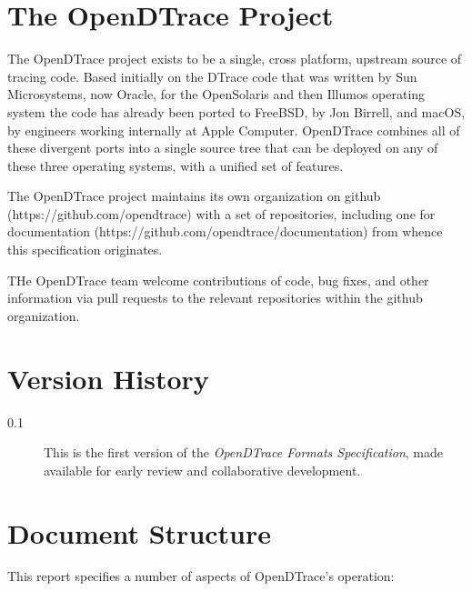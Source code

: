 
\section{The OpenDTrace Project}
\label{sec:opendtrace-project}

The OpenDTrace project exists to be a single, cross platform, upstream
source of tracing code.  Based initially on the DTrace code that was
written by Sun Microsystems, now Oracle, for the OpenSolaris and then
Illumos operating system the code has already been ported to FreeBSD,
by Jon Birrell, and macOS, by engineers working internally at Apple
Computer.  OpenDTrace combines all of these divergent ports into a
single source tree that can be deployed on any of these three
operating systems, with a unified set of features.  

The OpenDTrace project maintains its own organization on github
(https://github.com/opendtrace) with a set of repositories, including
one for documentation (https://github.com/opendtrace/documentation)
from whence this specification originates.

THe OpenDTrace team welcome contributions of code, bug fixes, and
other information via pull requests to the relevant repositories
within the github organization.

\section{Version History}

\begin{description}
\item[0.1] This is the first version of the \textit{OpenDTrace Formats
  Specification}, made available for early review and collaborative
  development.
\end{description}

\section{Document Structure}

This report specifies a number of aspects of OpenDTrace's operation:

